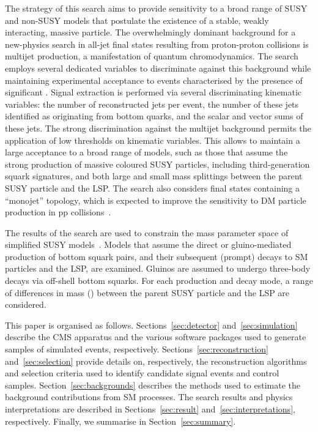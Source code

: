 The strategy of this search aims to provide sensitivity to a broad
range of SUSY and non-SUSY models that postulate the existence of a
stable, weakly interacting, massive particle. The overwhelmingly
dominant background for a new-physics search in all-jet final states
resulting from proton-proton collisions is multijet production, a
manifestation of quantum chromodynamics. The search employs several
dedicated variables to discriminate against this background while
maintaining experimental acceptance to events characterised by the
presence of significant \ptvecmiss. Signal extraction is performed via
several discriminating kinematic variables: the number of
reconstructed jets per event, the number of these jets identified as
originating from bottom quarks, and the scalar and vector \pt sums of
these jets. The strong discrimination against the multijet background
permits the application of low thresholds on kinematic variables. This
allows to maintain a large acceptance to a broad range of models, such
as those that assume the strong production of massive coloured SUSY
particles, including third-generation squark signatures, and both
large and small mass splittings between the parent SUSY particle and
the LSP. The search also considers final states containing a
``monojet'' topology, which is expected to improve the sensitivity to
DM particle production in pp collisions~\cite{Fox:2012ee,
  Buchmueller:2015eea}.

The results of the search are used to constrain the mass parameter
space of simplified SUSY models~\cite{Alwall:2008ag, Alwall:2008va,
  sms}. Models that assume the direct or gluino-mediated production of
bottom squark pairs, and their subsequent (prompt) decays to SM
particles and the LSP, are examined. Gluinos are assumed to undergo
three-body decays via off-shell bottom squarks. For each production
and decay mode, a range of differences in mass (\dm) between the
parent SUSY particle and the LSP are considered. 

This paper is organised as follows. Sections~\ref{sec:detector}
and~\ref{sec:simulation} describe the CMS apparatus and the various
software packages used to generate samples of simulated events,
respectively. Sections~\ref{sec:reconstruction}
and~\ref{sec:selection} provide details on, respectively, the
reconstruction algorithms and selection criteria used to identify
candidate signal events and control
samples. Section~\ref{sec:backgrounds} describes the methods used to
estimate the background contributions from SM processes. The search
results and physics interpretations are described in
Sections~\ref{sec:result} and~\ref{sec:interpretations},
respectively. Finally, we summarise in Section~\ref{sec:summary}.

